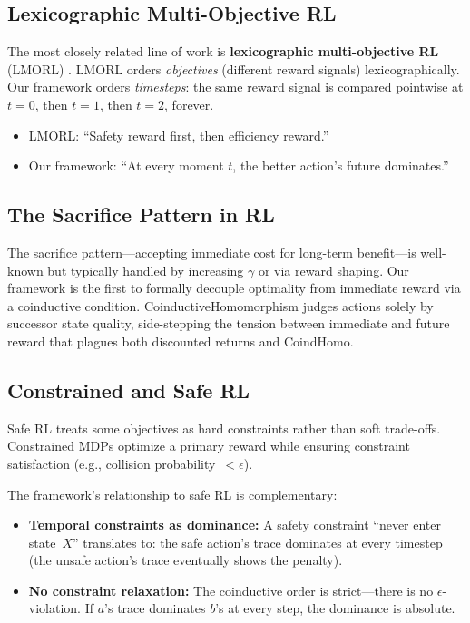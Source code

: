 \documentclass[9pt,a4paper]{article}
\theoremstyle{plain}
\theoremstyle{definition}
\theoremstyle{remark}
\begin{document}
\subsection{Lexicographic Multi-Objective RL}

The most closely related line of work is \textbf{lexicographic multi-objective RL} (LMORL) \cite{Skalse2022,Tercan2024}.  LMORL orders \emph{objectives} (different reward signals) lexicographically.  Our framework orders \emph{timesteps}: the same reward signal is compared pointwise at $t=0$, then $t=1$, then $t=2$, forever.

\begin{itemize}
\item LMORL: ``Safety reward first, then efficiency reward.''
\item Our framework: ``At every moment $t$, the better action's future dominates.''
\end{itemize}

\subsection{The Sacrifice Pattern in RL}

The sacrifice pattern---accepting immediate cost for long-term benefit---is well-known but typically handled by increasing $\gamma$ or via reward shaping.  Our framework is the first to formally decouple optimality from immediate reward via a coinductive condition.  CoinductiveHomomorphism judges actions solely by successor state quality, side-stepping the tension between immediate and future reward that plagues both discounted returns and CoindHomo.

\subsection{Constrained and Safe RL}

Safe RL \cite{Garcia2015} treats some objectives as hard constraints rather than soft trade-offs.  Constrained MDPs optimize a primary reward while ensuring constraint satisfaction (e.g., collision probability~$< \epsilon$).

The framework's relationship to safe RL is complementary:
\begin{itemize}
\item \textbf{Temporal constraints as dominance:} A safety constraint ``never enter state~$X$'' translates to: the safe action's trace dominates at every timestep (the unsafe action's trace eventually shows the penalty).
\item \textbf{No constraint relaxation:} The coinductive order is strict---there is no $\epsilon$-violation.  If $a$'s trace dominates $b$'s at every step, the dominance is absolute.
\end{itemize}
\end{document}
